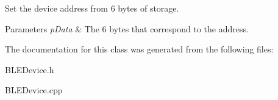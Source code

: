 Set the device address from 6 bytes of storage. 


\begin{DoxyParams}{Parameters}
{\em p\+Data} & The 6 bytes that correspond to the address. \\
\hline
\end{DoxyParams}


The documentation for this class was generated from the following files\+:\begin{DoxyCompactItemize}
\item 
B\+L\+E\+Device.\+h\item 
B\+L\+E\+Device.\+cpp\end{DoxyCompactItemize}
